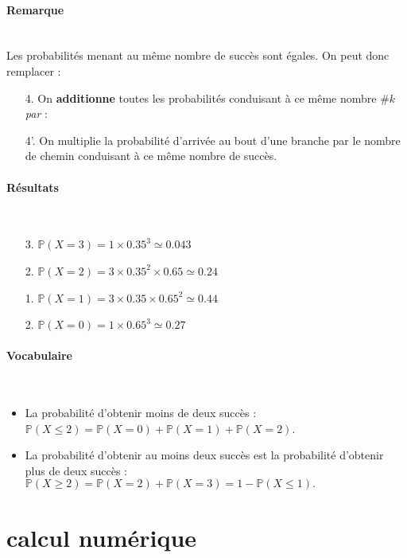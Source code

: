 \documentclass[paper=a4, fontsize=9pt]{scrartcl} %
\begin{document}
\paragraph{Remarque}~~\\
Les probabilités menant au même nombre de succès sont égales. On peut donc remplacer : 
\begin{enumerate}
\item[4.] On \textbf{additionne} toutes les probabilités conduisant à ce même nombre $\#k$ \hspace{1cm} \textit{par} :
\item[4'.] On multiplie la probabilité d'arrivée au bout d'une branche par le nombre de chemin conduisant à ce même nombre de succès.
\end{enumerate}

\paragraph{Résultats}~~\\
\begin{enumerate}
\item[3.] $\mathbb{P}(X=3) = 1 \times 0.35^3  \simeq 0.043$
\item[2.] $\mathbb{P}(X=2) = 3 \times 0.35^2 \times 0.65 \simeq 0.24$ 
\item[1.] $\mathbb{P}(X=1) = 3 \times 0.35 \times 0.65^2 \simeq 0.44$ 
\item[2.] $\mathbb{P}(X=0) = 1 \times 0.65^3 \simeq 0.27$  
\end{enumerate}

\paragraph{Vocabulaire}~~\\
\begin{itemize}
\item La probabilité d'obtenir moins de deux succès :\\
$\mathbb{P}(X \leq 2) = \mathbb{P}(X = 0) + \mathbb{P}(X = 1) + \mathbb{P}(X = 2)$.
\item  La probabilité d'obtenir au moins deux succès est la probabilité d'obtenir plus de deux succès :\\
$\mathbb{P}(X \geq 2) = \mathbb{P}(X = 2) + \mathbb{P}(X = 3) = 1 - \mathbb{P}(X \leq 1).$
\end{itemize}


\newpage
\section{calcul numérique}
\end{document}
